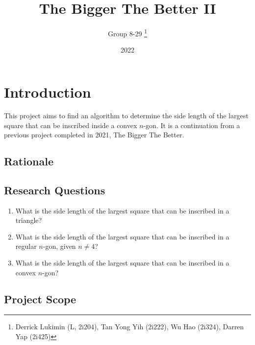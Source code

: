 \documentclass[12pt]{scrartcl}
\title{The Bigger The Better II}
\author{Group 8-29 \thanks{Derrick Lukimin (L, 2i204), Tan Yong Yih (2i222), Wu Hao (2i324), Darren Yap (2i425)}}
\date{2022}
\begin{document}
\onehalfspacing
\maketitle
\tableofcontents

\section{Introduction}
This project aims to find an algorithm to determine
the side length of the largest square that can be 
inscribed inside a convex $n$-gon. It is a continuation from
a previous project completed in 2021, The Bigger The Better.

\subsection{Rationale}

\subsection{Research Questions}
\begin{enumerate}
\item What is the side length of the largest square that can be inscribed in a triangle?
\item What is the side length of the largest square that can be inscribed in a regular $n$-gon, given $n \neq 4$?
\item What is the side length of the largest square that can be inscribed in a convex $n$-gon?
\end{enumerate}

\subsection{Project Scope}
\end{document}
